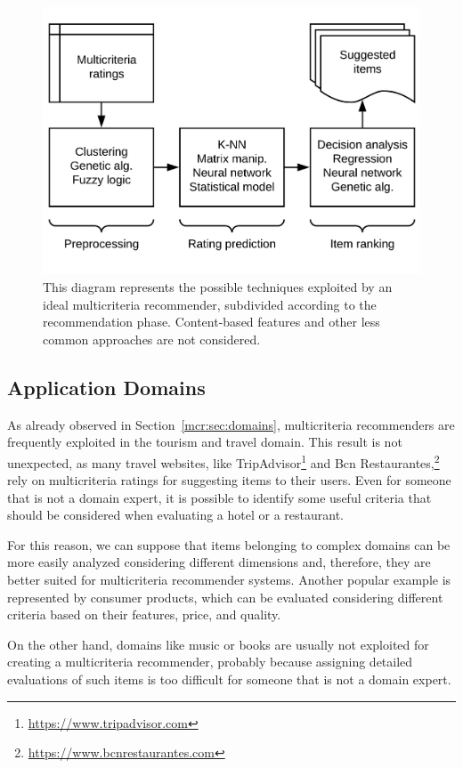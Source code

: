 \begin{figure}
\centering
\includegraphics[width=.9\textwidth]{multicriteria_techniques}
\caption[Ideal multicriteria recommender]{This diagram represents the possible techniques exploited by an ideal multicriteria recommender, subdivided according to the recommendation phase. Content-based features and other less common approaches are not considered.}
\label{mcr:fig:techniques}
\end{figure}

\subsection{Application Domains}

As already observed in Section~\ref{mcr:sec:domains}, multicriteria recommenders are frequently exploited in the tourism and travel domain. This result is not unexpected, as many travel websites, like TripAdvisor\footnote{\url{https://www.tripadvisor.com}} and Bcn Restaurantes,\footnote{\url{https://www.bcnrestaurantes.com}} rely on multicriteria ratings for suggesting items to their users. Even for someone that is not a domain expert, it is possible to identify some useful criteria that should be considered when evaluating a hotel or a restaurant.

For this reason, we can suppose that items belonging to complex domains can be more easily analyzed considering different dimensions and, therefore, they are better suited for multicriteria recommender systems. Another popular example is represented by consumer products, which can be evaluated considering different criteria based on their features, price, and quality.

On the other hand, domains like music or books are usually not exploited for creating a multicriteria recommender, probably because assigning detailed evaluations of such items is too difficult for someone that is not a domain expert.

